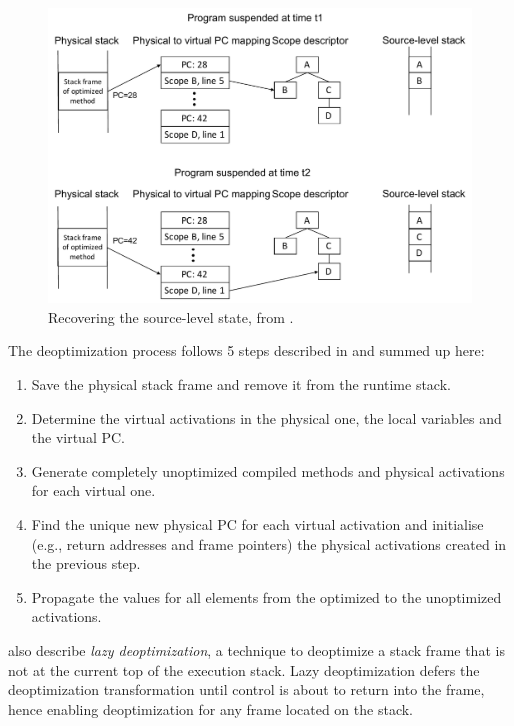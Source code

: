 \begin{figure}[h]
\centering
\includegraphics[scale=0.5]{Figures/Figure2}
\decoRule
\caption[Recovering the source-level state]{Recovering the source-level state, from \cite{holzle1992debugging}.}
\label{Holzle2}
\end{figure}


The deoptimization process follows 5 steps described in \cite{holzle1992debugging} and summed up here:
\begin{enumerate}
    \item Save the physical stack frame and remove it from the runtime stack.
    \item Determine the virtual activations in the physical one, the local variables and the virtual PC.
    \item Generate completely unoptimized compiled methods and physical activations for each virtual one.
    \item Find the unique new physical PC for each virtual activation and initialise (e.g., return addresses and frame pointers) the physical activations created in the previous step.
    \item Propagate the values for all elements from the optimized to the unoptimized activations.
\end{enumerate}

 also describe \textit{lazy deoptimization}, a technique to deoptimize a stack frame that is not at the current top of the execution stack. 
Lazy deoptimization defers the deoptimization transformation until control is about to return into the frame, hence enabling deoptimization for any frame located on the stack.\\

